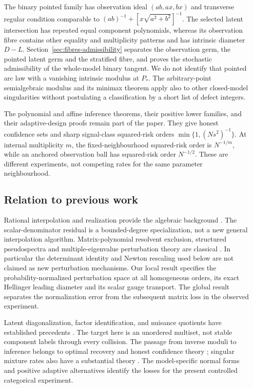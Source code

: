 \documentclass[11pt,reqno]{amsart}
\numberwithin{equation}{section}
\theoremstyle{definition}\newtheorem{definition}[theorem]{Definition}
\theoremstyle{remark}\newtheorem{remark}[theorem]{Remark}
\begin{document}
The binary pointed family has observation ideal $(ab,ax,bx)$ and
transverse regular condition comparable to
$(ab)^{-1}+[x\sqrt{a^2+b^2}]^{-1}$. The selected latent intersection
has repeated equal component polynomials, whereas its observation
fibre contains other equality and multiplicity patterns and has
intrinsic diameter $D-L$. Section~\ref{sec:fibres-admissibility}
separates the observation germ, the pointed latent germ and the
stratified fibre, and proves the stochastic admissibility of the
whole-model binary tangent. We do not identify that pointed arc law
with a vanishing intrinsic modulus at $P_*$. The arbitrary-point
semialgebraic modulus and its minimax theorem apply also to other
closed-model singularities without postulating a classification by a
short list of defect integers.

The polynomial and affine inference theorems, their positive lower
families, and their adaptive-design proofs remain part of the paper.
They give honest confidence sets and sharp signal-class squared-risk
orders $\min\{1,(Ns^2)^{-1}\}$. At internal multiplicity $m$, the
fixed-neighbourhood squared-risk order is $N^{-1/m}$, while an
anchored observation ball has squared-risk order $N^{-1/2}$.
These are different experiments, not competing rates for the same
parameter neighbourhood.

\subsection{Relation to previous work}
Rational interpolation and realization provide the algebraic
background \cite{VBB,AA90,BL00,MA07}. The scalar-denominator residual
is a bounded-degree specialization, not a new general interpolation
algorithm. Matrix-polynomial resolvent exclusion, structured
pseudospectra and multiple-eigenvalue perturbation theory are classical
\cite{BF,Chu87,Chu03,GLR82,MBO97,TH,KPM09,HMT,SB}.
In particular the determinant identity and Newton rescaling used
below are not claimed as new perturbation mechanisms. Our local
result specifies the probability-normalized perturbation space at all
homogeneous orders, its exact Hellinger leading diameter and its scalar
gauge transport. The global result separates the normalization error
from the subsequent matrix loss in the observed experiment.

Latent diagonalization, factor identification, and nuisance quotients
have established precedents \cite{AMR,BJR,BCV,LLB}. The target here
is an unordered multiset, not stable component labels through every
collision. The passage from inverse moduli to inference belongs to
optimal recovery and honest confidence theory \cite{Donoho,CaiLow,Dufour};
singular mixture rates also have a substantial theory \cite{HN}.
The model-specific normal forms and positive adaptive alternatives
identify the losses for the present controlled categorical experiment.
\end{document}

